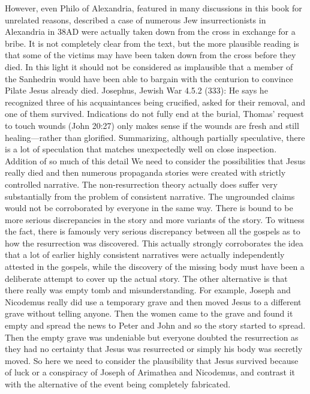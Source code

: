 However, even Philo of Alexandria, featured in many discussions in this book for unrelated reasons, described a case of numerous Jew insurrectionists in Alexandria in 38AD were actually taken down from the cross in exchange for a bribe.
It is not completely clear from the text, but the more plausible reading is that some of the victims may have been taken down from the cross before they died.
In this light it should not be considered as implausible that a member of the Sanhedrin would have been able to bargain with the centurion to convince Pilate Jesus already died.
Josephus, Jewish War 4.5.2 (333): He says he recognized three of his acquaintances being crucified, asked for their removal, and one of them survived.
Indications do not fully end at the burial, Thomas’ request to touch wounds (John 20:27) only makes sense if the wounds are fresh and still healing—rather than glorified.
Summarizing, although partially speculative, there is a lot of speculation that matches unexpectedly well on close inspection.
Addition of so much of this detail We need to consider the possibilities that Jesus really died and then numerous propaganda stories were created with strictly controlled narrative.
The non-resurrection theory actually does suffer very substantially from the problem of consistent narrative.
The ungrounded claims would not be corroborated by everyone in the same way.
There is bound to be more serious discrepancies in the story and more variants of the story.
To witness the fact, there is famously very serious discrepancy between all the gospels as to how the resurrection was discovered.
This actually strongly corroborates the idea that a lot of earlier highly consistent narratives were actually independently attested in the gospels, while the discovery of the missing body must have been a deliberate attempt to cover up the actual story.
The other alternative is that there really was empty tomb and misunderstanding.
For example, Joseph and Nicodemus really did use a temporary grave and then moved Jesus to a different grave without telling anyone.
Then the women came to the grave and found it empty and spread the news to Peter and John and so the story started to spread.
Then the empty grave was undeniable but everyone doubted the resurrection as they had no certainty that Jesus was resurrected or simply his body was secretly moved.
So here we need to consider the plausibility that Jesus survived because of luck or a conspiracy of Joseph of Arimathea and Nicodemus, and contrast it with the alternative of the event being completely fabricated.
